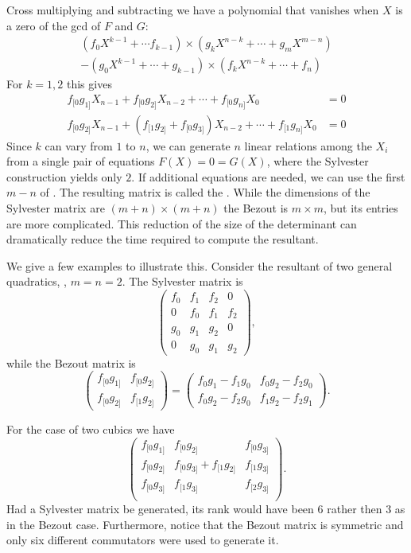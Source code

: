 Cross multiplying and subtracting we have a polynomial that vanishes when
$X$ is a zero of the {\sc gcd} of $F$ and $G$:
\begin{multline}
(f_0 X^{k-1} + \cdots f_{k-1}) \times (g_k X^{n-k} + \cdots + g_m
 X^{m-n})\\
 - (g_0 X^{k-1} + \cdots + g_{k-1}) \times (f_k X^{n - k} + \cdots +
 f_n)
\end{multline}
For $k = 1, 2$ this gives
\[
\begin{aligned}
f_{[0} g_{1]} X_{n-1} + f_{[0} g_{2]} X_{n -2} + \cdots + f_{[0} g_{n]}
X_0& = 0 \\ f_{[0} g_{2]} X_{n-1} + (f_{[1} g_{2]} + f_{[0} g_{3]}) X_{n-2}
+ \cdots + f_{[1} g_{n]} X_0& = 0
\end{aligned}
\]
Since $k$ can vary from $1$ to $n$, we can generate $n$ linear
relations among the $X_i$ from a single pair of equations $F(X) = 0 =
G(X)$, where the Sylvester construction yields only $2$.  If
additional equations are needed, we can use the first $m-n$ of
.  The resulting matrix is called the
.  While the dimensions of the Sylvester matrix
are $(m+n)\times(m+n)$ the Bezout is $m \times m$, but its entries are
more complicated.  This reduction of the size of the determinant can
dramatically reduce the time required to compute the resultant.

We give a few examples to illustrate this.  Consider the resultant of
two general quadratics, \ie, $m=n=2$.  The Sylvester matrix is
\[
\begin{pmatrix}
  f_0& f_1& f_2& 0 \\
  0& f_0& f_1 & f_2\\
 g_0& g_1& g_2& 0 \\
0& g_0& g_1 & g_2\end{pmatrix},
\]
while the Bezout matrix is
\[
\begin{pmatrix}f_{[0}g_{1]} &f_{[0}g_{2]} \\ f_{[0}g_{2]} &f_{[1}g_{2]} \end{pmatrix}=
\begin{pmatrix}f_0g_1 - f_1 g_0 & f_0 g_2 - f_2 g_0 \\ f_0 g_2 - f_2 g_0 & f_1
g_2 - f_2 g_1\end{pmatrix}.
\]

For the case of two cubics we have
\begin{equation}
\begin{pmatrix}
  f_{[0}g_{1]} & f_{[0}g_{2]} & f_{[0} g_{3]} \\
  f_{[0}g_{2]} & f_{[0}g_{3]} + f_{[1}g_{2]} & f_{[1} g_{3]} \\
  f_{[0}g_{3]} & f_{[1}g_{3]} & f_{[2} g_{3]} \\
  \end{pmatrix}.
\label{Cubic:Bezout:Eq}
\end{equation}
Had a Sylvester matrix be generated, its rank would have been $6$
rather then $3$ as in the Bezout case.  Furthermore, notice that the
Bezout matrix is symmetric and only six different commutators were
used to generate it.

